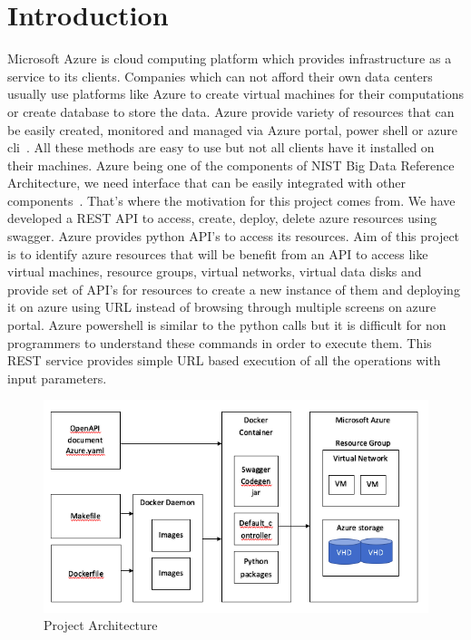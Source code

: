 \section{Introduction}
Microsoft Azure is cloud computing platform which provides infrastructure as a
service to its clients. Companies which can not afford their own data centers
usually use platforms like Azure to create virtual machines for their
computations or create database to store the data. Azure provide variety of
resources that can be easily created, monitored and managed via Azure portal,
power shell or azure cli~\cite{hid-sp18-502-microsoft-azure}. All these methods
are easy to use but not all clients
have it installed on their machines. Azure being one of the components of NIST
Big Data Reference Architecture, we need interface that can be easily
integrated with other components~\cite{hid-sp18-502-nist-vol8}. That's where
the motivation for this project comes from. We have developed a REST API to
access, create, deploy, delete azure resources using swagger. Azure provides
python API's to access its resources. Aim of this project is to identify azure
resources that will be benefit from an API to access like virtual machines,
resource groups, virtual networks, virtual data disks and provide set
of API's for resources  to create a new instance of them and deploying it on
azure using URL instead of browsing through multiple screens on azure portal.
Azure powershell is similar to the python calls but it is difficult for non
programmers to understand these commands in order to execute them. This REST
service provides simple URL based execution of all the operations with input
parameters.

\begin{figure}[!ht]
        \centering\includegraphics[width=\columnwidth]
        {image/project-architecture.PNG}
        \caption{Project Architecture}\label{fig:project-architecture}
\end{figure}

